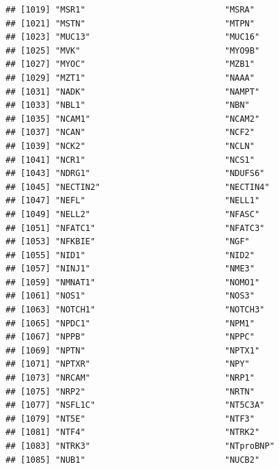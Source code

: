 \documentclass[
]{article}
\begin{document}
\begin{verbatim}
## [1019] "MSR1"                            "MSRA"                           
## [1021] "MSTN"                            "MTPN"                           
## [1023] "MUC13"                           "MUC16"                          
## [1025] "MVK"                             "MYO9B"                          
## [1027] "MYOC"                            "MZB1"                           
## [1029] "MZT1"                            "NAAA"                           
## [1031] "NADK"                            "NAMPT"                          
## [1033] "NBL1"                            "NBN"                            
## [1035] "NCAM1"                           "NCAM2"                          
## [1037] "NCAN"                            "NCF2"                           
## [1039] "NCK2"                            "NCLN"                           
## [1041] "NCR1"                            "NCS1"                           
## [1043] "NDRG1"                           "NDUFS6"                         
## [1045] "NECTIN2"                         "NECTIN4"                        
## [1047] "NEFL"                            "NELL1"                          
## [1049] "NELL2"                           "NFASC"                          
## [1051] "NFATC1"                          "NFATC3"                         
## [1053] "NFKBIE"                          "NGF"                            
## [1055] "NID1"                            "NID2"                           
## [1057] "NINJ1"                           "NME3"                           
## [1059] "NMNAT1"                          "NOMO1"                          
## [1061] "NOS1"                            "NOS3"                           
## [1063] "NOTCH1"                          "NOTCH3"                         
## [1065] "NPDC1"                           "NPM1"                           
## [1067] "NPPB"                            "NPPC"                           
## [1069] "NPTN"                            "NPTX1"                          
## [1071] "NPTXR"                           "NPY"                            
## [1073] "NRCAM"                           "NRP1"                           
## [1075] "NRP2"                            "NRTN"                           
## [1077] "NSFL1C"                          "NT5C3A"                         
## [1079] "NT5E"                            "NTF3"                           
## [1081] "NTF4"                            "NTRK2"                          
## [1083] "NTRK3"                           "NTproBNP"                       
## [1085] "NUB1"                            "NUCB2"                          

\end{verbatim}
\end{document}
